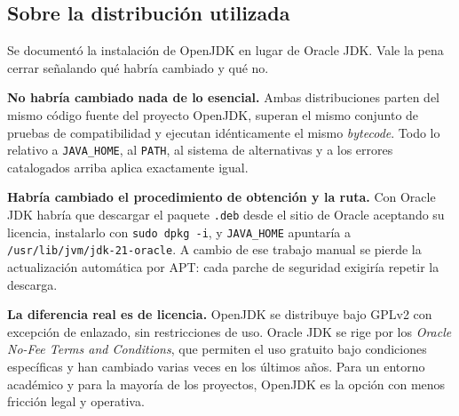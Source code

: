 \subsection{Sobre la distribución utilizada}

Se documentó la instalación de OpenJDK en lugar de Oracle JDK. Vale la pena cerrar
señalando qué habría cambiado y qué no.

\textbf{No habría cambiado nada de lo esencial.} Ambas distribuciones parten del mismo
código fuente del proyecto OpenJDK, superan el mismo conjunto de pruebas de
compatibilidad y ejecutan idénticamente el mismo \textit{bytecode}. Todo lo relativo a
\texttt{JAVA\_HOME}, al \texttt{PATH}, al sistema de alternativas y a los errores
catalogados arriba aplica exactamente igual.

\textbf{Habría cambiado el procedimiento de obtención y la ruta.} Con Oracle JDK habría
que descargar el paquete \texttt{.deb} desde el sitio de Oracle aceptando su licencia,
instalarlo con \texttt{sudo dpkg -i}, y \texttt{JAVA\_HOME} apuntaría a
\texttt{/usr/lib/jvm/jdk-21-oracle}. A cambio de ese trabajo manual se pierde la
actualización automática por APT: cada parche de seguridad exigiría repetir la descarga.

\textbf{La diferencia real es de licencia.} OpenJDK se distribuye bajo GPLv2 con
excepción de enlazado, sin restricciones de uso. Oracle JDK se rige por los
\textit{Oracle No-Fee Terms and Conditions}, que permiten el uso gratuito bajo
condiciones específicas y han cambiado varias veces en los últimos años. Para un entorno
académico y para la mayoría de los proyectos, OpenJDK es la opción con menos fricción
legal y operativa.
